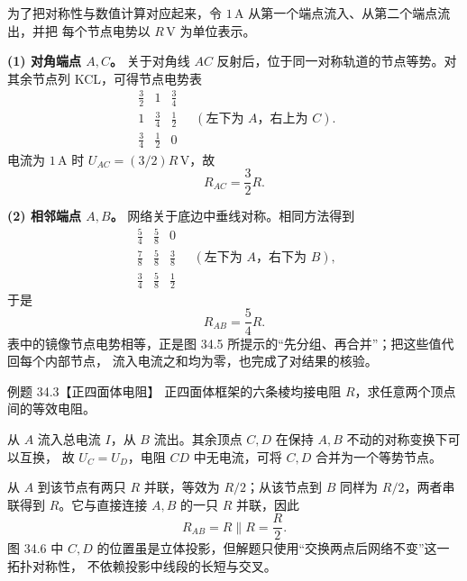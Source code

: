 \begin{xesolution}
为了把对称性与数值计算对应起来，令 $1\,\mathrm A$ 从第一个端点流入、从第二个端点流出，并把
每个节点电势以 $R\,\mathrm V$ 为单位表示。

\textbf{(1) 对角端点 $A,C$。}
关于对角线 $AC$ 反射后，位于同一对称轨道的节点等势。对其余节点列 KCL，可得节点电势表
\[
\begin{array}{ccc}
\frac32&1&\frac34\\[2pt]
1&\frac34&\frac12\\[2pt]
\frac34&\frac12&0
\end{array}
\quad(\text{左下为 }A\text{，右上为 }C).
\]
电流为 $1\,\mathrm A$ 时 $U_{AC}=(3/2)R\,\mathrm V$，故
\begin{equation}
  \boxed{R_{AC}=\frac32R}.
\end{equation}

\textbf{(2) 相邻端点 $A,B$。}
网络关于底边中垂线对称。相同方法得到
\[
\begin{array}{ccc}
\frac54&\frac58&0\\[2pt]
\frac78&\frac58&\frac38\\[2pt]
\frac34&\frac58&\frac12
\end{array}
\quad(\text{左下为 }A\text{，右下为 }B),
\]
于是
\begin{equation}
  \boxed{R_{AB}=\frac54R}.
\end{equation}
表中的镜像节点电势相等，正是图 34.5 所提示的“先分组、再合并”；把这些值代回每个内部节点，
流入电流之和均为零，也完成了对结果的核验。

\gridDiagram
\end{xesolution}

\Needspace{0.34\textheight}
\begin{origexamplebox}{例题 34.3【正四面体电阻】}
正四面体框架的六条棱均接电阻 $R$，求任意两个顶点间的等效电阻。
\end{origexamplebox}

\begin{xesolution}
从 $A$ 流入总电流 $I$，从 $B$ 流出。其余顶点 $C,D$ 在保持 $A,B$ 不动的对称变换下可以互换，
故 $U_C=U_D$，电阻 $CD$ 中无电流，可将 $C,D$ 合并为一个等势节点。

从 $A$ 到该节点有两只 $R$ 并联，等效为 $R/2$；从该节点到 $B$ 同样为 $R/2$，两者串联得到
$R$。它与直接连接 $A,B$ 的一只 $R$ 并联，因此
\begin{equation}
  \boxed{R_{AB}=R\parallel R=\frac R2}.
\end{equation}
图 34.6 中 $C,D$ 的位置虽是立体投影，但解题只使用“交换两点后网络不变”这一拓扑对称性，
不依赖投影中线段的长短与交叉。

\tetrahedronDiagram
\end{xesolution}

